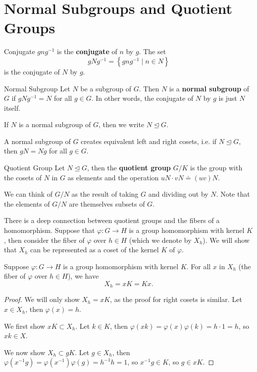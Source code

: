 \documentclass[10pt]{report}
\begin{document}

\section{Normal Subgroups and Quotient Groups}

\begin{defn}{Conjugate}{}
$gng^{-1}$ is the \textbf{conjugate} of $n$ by $g$. The set
\[
gNg^{-1}=\left\{ gng^{-1}\;|\;n\in N \right\}
\] is the conjugate of $N$ by $g$.
\end{defn}

\begin{defn}{Normal Subgroup}{}
Let $N$ be a subgroup of $G$. Then $N$ is a \textbf{normal subgroup} of $G$ if $gNg^{-1}=N$ for all $g\in G$. In other words, the conjugate of $N$ by $g$ is just $N$ itself.

If $N$ is a normal subgroup of $G$, then we write $N \trianglelefteq G$.
\end{defn}

\begin{note}{}{}
A normal subgroup of $G$ creates equivalent left and right cosets, i.e. if $N \trianglelefteq G$, then $gN=Ng$ for all $g \in G$.
\end{note}

\begin{defn}{Quotient Group}{}
	Let $N \trianglelefteq G$, then the \textbf{quotient group} $G/K$ is the group with the cosets of $N$ in $G$ as elements and the operation $uN \cdot vN \doteq (uv)N$.
\end{defn}

We can think of $G/N$ as the result of taking $G$ and dividing out by $N$. Note that the elements of $G/N$ are themselves subsets of $G$.

There is a deep connection between quotient groups and the fibers of a homomorphism. Suppose that $\varphi:G\to H$ is a group homomorphism with kernel $K$, then consider the fiber of $\varphi$ over $h\in H$ (which we denote by $X_h$). We will show that $X_h$ can be represented as a coset of the kernel $K$ of $\varphi$.

\begin{prop}
Suppose $\varphi:G\to H$ is a group homomorphism with kernel $K$. For all $x$ in $X_h$ (the fiber of $\varphi$ over $h\in H$), we have \[X_h = xK = Kx.\]
\end{prop}
\begin{proof}
We will only show $X_h = xK$, as the proof for right cosets is similar. Let $x \in X_h$, then $\varphi(x)=h$.

We first show $xK \subset X_h$. Let $k \in K$, then $\varphi(xk) = \varphi(x)\varphi(k) = h\cdot 1 = h$, so $xk \in X$.

We now show $X_h \subset gK$. Let $g \in X_h$, then $\varphi(x^{-1}g)=\varphi(x^{-1})\varphi(g)=h^{-1}h=1$, so $x^{-1}g \in K$, so $g \in xK$.
\end{proof}
\end{document}
